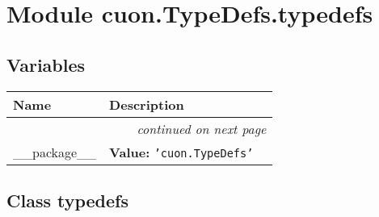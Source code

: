 %
%
%


\section{Module cuon.TypeDefs.typedefs}

    \label{cuon:TypeDefs:typedefs}


  \subsection{Variables}

    \vspace{-1cm}
\hspace{\varindent}\begin{longtable}{|p{\varnamewidth}|p{\vardescrwidth}|l}
\cline{1-2}
\cline{1-2} \centering \textbf{Name} & \centering \textbf{Description}& \\
\cline{1-2}
\endhead\cline{1-2}\multicolumn{3}{r}{\small\textit{continued on next page}}\\\endfoot\cline{1-2}
\endlastfoot\raggedright \_\-\_\-p\-a\-c\-k\-a\-g\-e\-\_\-\_\- & \raggedright \textbf{Value:} 
{\tt \texttt{'}\texttt{cuon.TypeDefs}\texttt{'}}&\\
\cline{1-2}
\end{longtable}



\subsection{Class typedefs}

